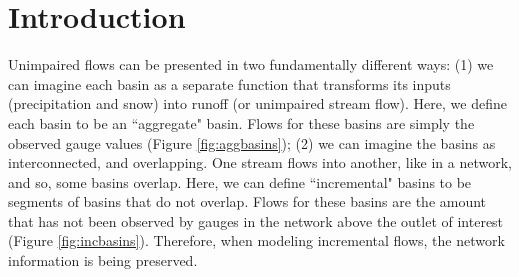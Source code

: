 \section{Introduction}
Unimpaired flows can be presented in two fundamentally different ways: (1) we can imagine each basin as a separate function that transforms its inputs (precipitation and snow) into runoff (or unimpaired stream flow). Here, we define each basin to be an ``aggregate" basin. Flows for these basins are simply the observed gauge values (Figure \ref{fig:aggbasins}); (2) we can imagine the basins as interconnected, and overlapping. One stream flows into another, like in a network, and so, some basins overlap. Here, we can define ``incremental" basins to be segments of basins that do not overlap. Flows for these basins are the amount that has not been observed by gauges in the network above the outlet of interest (Figure \ref{fig:incbasins}). Therefore, when modeling incremental flows, the network information is being preserved.


